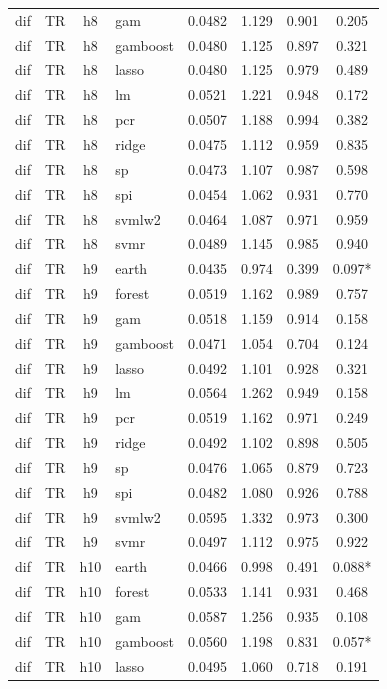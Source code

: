 \begin{ThreePartTable}
\begin{longtable}[t]{llclcccc}
dif & TR & h8 & gam & 0.0482 & 1.129 & 0.901 & 0.205\\
dif & TR & h8 & gamboost & 0.0480 & 1.125 & 0.897 & 0.321\\
dif & TR & h8 & lasso & 0.0480 & 1.125 & 0.979 & 0.489\\
dif & TR & h8 & lm & 0.0521 & 1.221 & 0.948 & 0.172\\
dif & TR & h8 & pcr & 0.0507 & 1.188 & 0.994 & 0.382\\
dif & TR & h8 & ridge & 0.0475 & 1.112 & 0.959 & 0.835\\
dif & TR & h8 & sp & 0.0473 & 1.107 & 0.987 & 0.598\\
dif & TR & h8 & spi & 0.0454 & 1.062 & 0.931 & 0.770\\
dif & TR & h8 & svmlw2 & 0.0464 & 1.087 & 0.971 & 0.959\\
dif & TR & h8 & svmr & 0.0489 & 1.145 & 0.985 & 0.940\\
\addlinespace
dif & TR & h9 & earth & 0.0435 & 0.974 & 0.399 & 0.097*\\
dif & TR & h9 & forest & 0.0519 & 1.162 & 0.989 & 0.757\\
dif & TR & h9 & gam & 0.0518 & 1.159 & 0.914 & 0.158\\
dif & TR & h9 & gamboost & 0.0471 & 1.054 & 0.704 & 0.124\\
dif & TR & h9 & lasso & 0.0492 & 1.101 & 0.928 & 0.321\\
dif & TR & h9 & lm & 0.0564 & 1.262 & 0.949 & 0.158\\
dif & TR & h9 & pcr & 0.0519 & 1.162 & 0.971 & 0.249\\
dif & TR & h9 & ridge & 0.0492 & 1.102 & 0.898 & 0.505\\
dif & TR & h9 & sp & 0.0476 & 1.065 & 0.879 & 0.723\\
dif & TR & h9 & spi & 0.0482 & 1.080 & 0.926 & 0.788\\
dif & TR & h9 & svmlw2 & 0.0595 & 1.332 & 0.973 & 0.300\\
dif & TR & h9 & svmr & 0.0497 & 1.112 & 0.975 & 0.922\\
\addlinespace
dif & TR & h10 & earth & 0.0466 & 0.998 & 0.491 & 0.088*\\
dif & TR & h10 & forest & 0.0533 & 1.141 & 0.931 & 0.468\\
dif & TR & h10 & gam & 0.0587 & 1.256 & 0.935 & 0.108\\
dif & TR & h10 & gamboost & 0.0560 & 1.198 & 0.831 & 0.057*\\
dif & TR & h10 & lasso & 0.0495 & 1.060 & 0.718 & 0.191\\

\end{longtable}
\end{ThreePartTable}

